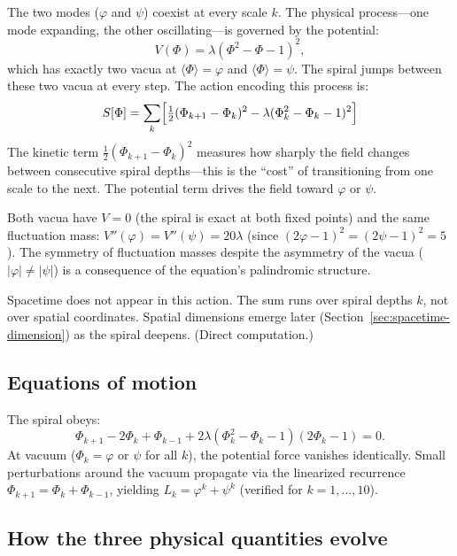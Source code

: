 \documentclass[12pt,a4paper]{article}
\begin{document}
The two modes ($\varphi$ and $\psi$) coexist at every scale $k$. The physical process---one mode expanding, the other oscillating---is governed by the potential:
\begin{equation}
V(\Phi) = \lambda(\Phi^2 - \Phi - 1)^2,
\end{equation}
which has exactly two vacua at $\langle\Phi\rangle = \varphi$ and $\langle\Phi\rangle = \psi$. The spiral jumps between these two vacua at every step. The action encoding this process is:
\begin{equation}
S[\Phi] = \sum_{k}\Bigl[\tfrac{1}{2}(\Phi_{k+1} - \Phi_k)^2 - \lambda(\Phi_k^2 - \Phi_k - 1)^2\Bigr]
\label{eq:action}
\end{equation}
The kinetic term $\frac{1}{2}(\Phi_{k+1} - \Phi_k)^2$ measures how sharply the field changes between consecutive spiral depths---this is the ``cost'' of transitioning from one scale to the next. The potential term drives the field toward $\varphi$ or $\psi$.

Both vacua have $V = 0$ (the spiral is exact at both fixed points) and the same fluctuation mass: $V''(\varphi) = V''(\psi) = 20\lambda$ (since $(2\varphi-1)^2 = (2\psi-1)^2 = 5$). The symmetry of fluctuation masses despite the asymmetry of the vacua ($|\varphi| \neq |\psi|$) is a consequence of the equation's palindromic structure.

Spacetime does not appear in this action. The sum runs over spiral depths $k$, not over spatial coordinates. Spatial dimensions emerge later (Section~\ref{sec:spacetime-dimension}) as the spiral deepens. (Direct computation.)

\subsection{Equations of motion}

The spiral obeys:
\begin{equation}
\Phi_{k+1} - 2\Phi_k + \Phi_{k-1} + 2\lambda(\Phi_k^2 - \Phi_k - 1)(2\Phi_k - 1) = 0.
\end{equation}
At vacuum ($\Phi_k = \varphi$ or $\psi$ for all $k$), the potential force vanishes identically. Small perturbations around the vacuum propagate via the linearized recurrence $\Phi_{k+1} = \Phi_k + \Phi_{k-1}$, yielding $L_k = \varphi^k + \psi^k$ (verified for $k = 1, \ldots, 10$).

\subsection{How the three physical quantities evolve}
\end{document}
